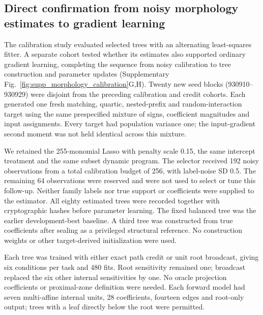 \subsection{Direct confirmation from noisy morphology estimates to gradient learning}
\label{note:morphology_end_to_end}

The calibration study evaluated selected trees with an alternating least-squares
fitter. A separate cohort tested whether its estimates also supported
ordinary gradient learning, completing the sequence from noisy calibration
to tree construction and parameter updates (Supplementary Fig.~\ref{fig:supp_morphology_calibration}G,H). Twenty new seed
blocks (930910--930929) were disjoint from the preceding calibration and
credit cohorts. Each generated one fresh matching, quartic, nested-prefix
and random-interaction target using the same prespecified mixture of signs,
coefficient magnitudes and input assignments. Every target had population
variance one; the input-gradient second moment was not held identical across
this mixture.

We retained the 255-monomial Lasso with penalty scale 0.15, the same
intercept treatment and the same subset dynamic program. The selector received 192 noisy observations
from a total calibration budget of 256, with label-noise SD 0.5. The remaining
64 observations were reserved and were not used to select or tune this
follow-up. Neither family labels nor true support or coefficients were
supplied to the estimator. All eighty estimated trees were recorded together with cryptographic
hashes before parameter learning. The fixed balanced tree was the earlier
development-best baseline. A third tree was constructed from true
coefficients after sealing as a privileged structural reference. No
construction weights or other target-derived initialization were used.

Each tree was trained with either exact path credit or unit root broadcast,
giving six conditions per task and 480 fits. Root sensitivity remained one;
broadcast replaced the six other internal sensitivities by one. No oracle
projection coefficients or proximal-zone definition were needed. Each
forward model had seven multi-affine internal units, 28 coefficients,
fourteen edges and root-only output; trees with a leaf directly below the
root were permitted.

